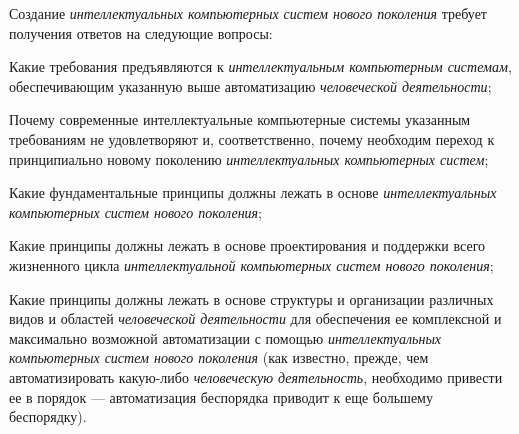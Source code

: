 Создание \textit{интеллектуальных компьютерных систем нового поколения} требует получения ответов на следующие вопросы:
\begin{textitemize}
	\item Какие требования предъявляются к \textit{интеллектуальным компьютерным системам}, обеспечивающим указанную выше  автоматизацию \textit{человеческой деятельности};
	\item Почему современные интеллектуальные компьютерные системы указанным требованиям не удовлетворяют и, соответственно, почему необходим переход к принципиально новому поколению \textit{интеллектуальных компьютерных систем};
	\item Какие фундаментальные принципы должны лежать в основе \textit{интеллектуальных компьютерных систем нового поколения};
	\item Какие принципы должны лежать в основе  проектирования и поддержки всего жизненного цикла \textit{интеллектуальной компьютерных систем нового поколения};
	\item Какие принципы должны лежать в основе структуры и организации различных видов и областей \textit{человеческой деятельности} для обеспечения ее комплексной и максимально возможной автоматизации с помощью \textit{интеллектуальных компьютерных систем нового поколения} (как известно, прежде, чем автоматизировать какую-либо \textit{человеческую деятельность}, необходимо привести ее в порядок --- автоматизация беспорядка приводит к еще большему беспорядку).
\end{textitemize}


